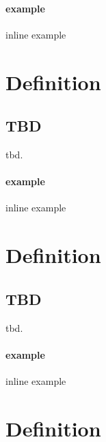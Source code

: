 \documentclass{report}
\begin{document}
\paragraph{example} inline example

\section{Definition}



\subsection{TBD}

tbd.






\paragraph{example} inline example

\section{Definition}



\subsection{TBD}

tbd.






\paragraph{example} inline example

\section{Definition}
\end{document}
